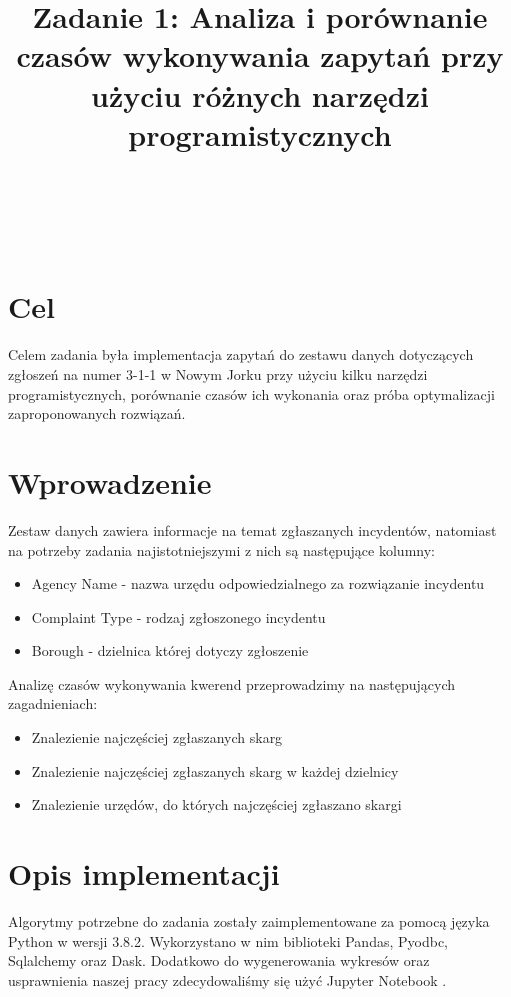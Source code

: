 \documentclass{classrep}
\author{%
\\
  \studentinfo[234128@edu.p.lodz.pl]{Piotr Wardęcki}{234128}\\
  \studentinfo[234053@edu.p.lodz.pl]{Paweł Galewicz}{234053}\\
  \studentinfo[234067@edu.p.lodz.pl]{Bartosz Jurczewski}{234067}%
}
\title{Zadanie 1: Analiza i porównanie czasów wykonywania zapytań przy użyciu różnych narzędzi programistycznych}
\begin{document}
\maketitle
\thispagestyle{fancyplain}
\clearpage

\section{Cel}
Celem zadania była implementacja zapytań do zestawu danych dotyczących zgłoszeń na numer 3-1-1 w Nowym Jorku \cite{dataset} przy użyciu kilku narzędzi programistycznych, porównanie czasów ich wykonania oraz próba optymalizacji zaproponowanych rozwiązań.

\section{Wprowadzenie}
Zestaw danych zawiera informacje na temat zgłaszanych incydentów, natomiast na potrzeby zadania najistotniejszymi z nich są następujące kolumny:

\begin{itemize}
    \item Agency Name - nazwa urzędu odpowiedzialnego za rozwiązanie incydentu
    \item Complaint Type - rodzaj zgłoszonego incydentu 
    \item Borough - dzielnica której dotyczy zgłoszenie
\end{itemize}

Analizę czasów wykonywania kwerend przeprowadzimy na następujących zagadnieniach:

\begin{itemize}
    \item Znalezienie najczęściej zgłaszanych skarg
    \item Znalezienie najczęściej zgłaszanych skarg w każdej dzielnicy
    \item Znalezienie urzędów, do których najczęściej zgłaszano skargi 
\end{itemize}

\section{Opis implementacji}
Algorytmy potrzebne do zadania zostały zaimplementowane za pomocą języka Python w wersji 3.8.2.
Wykorzystano w nim biblioteki Pandas, Pyodbc, Sqlalchemy oraz Dask.
Dodatkowo do wygenerowania wykresów oraz usprawnienia naszej pracy zdecydowaliśmy się użyć Jupyter Notebook \cite{jupyter}.
\end{document}

